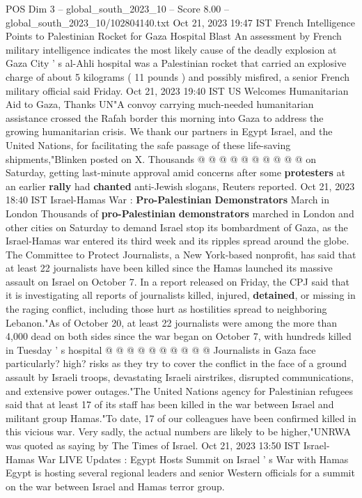 \begin{textsample}{POS Dim 3 – global\_south\_2023\_10 – Score 8.00 – global\_south\_2023\_10/102804140.txt}
Oct 21, 2023 19:47 IST French Intelligence Points to Palestinian Rocket for Gaza Hospital Blast An assessment by French military intelligence indicates the most likely cause of the deadly explosion at Gaza City ' s al-Ahli hospital was a Palestinian rocket that carried an explosive charge of about 5 kilograms ( 11 pounds ) and possibly misfired, a senior French military official said Friday.
Oct 21, 2023 19:40 IST US Welcomes Humanitarian Aid to Gaza, Thanks UN"A convoy carrying much-needed humanitarian assistance crossed the Rafah border this morning into Gaza to address the growing humanitarian crisis.
We thank our partners in Egypt Israel, and the United Nations, for facilitating the safe passage of these life-saving shipments,"Blinken posted on X.
Thousands @ @ @ @ @ @ @ @ @ @ on Saturday, getting last-minute approval amid concerns after some \textbf{protesters} at an earlier \textbf{rally} had \textbf{chanted} anti-Jewish slogans, Reuters reported.
Oct 21, 2023 18:40 IST Israel-Hamas War : \textbf{Pro-Palestinian} \textbf{Demonstrators} March in London Thousands of \textbf{pro-Palestinian} \textbf{demonstrators} marched in London and other cities on Saturday to demand Israel stop its bombardment of Gaza, as the Israel-Hamas war entered its third week and its ripples spread around the globe.
The Committee to Protect Journalists, a New York-based nonprofit, has said that at least 22 journalists have been killed since the Hamas launched its massive assault on Israel on October 7.
In a report released on Friday, the CPJ said that it is investigating all reports of journalists killed, injured, \textbf{detained}, or missing in the raging conflict, including those hurt as hostilities spread to neighboring Lebanon."As of October 20, at least 22 journalists were among the more than 4,000 dead on both sides since the war began on October 7, with hundreds killed in Tuesday ' s hospital @ @ @ @ @ @ @ @ @ @ Journalists in Gaza face particularly? high? risks as they try to cover the conflict in the face of a ground assault by Israeli troops, devastating Israeli airstrikes, disrupted communications, and extensive power outages."The United Nations agency for Palestinian refugees said that at least 17 of its staff has been killed in the war between Israel and militant group Hamas."To date, 17 of our colleagues have been confirmed killed in this vicious war.
Very sadly, the actual numbers are likely to be higher,"UNRWA was quoted as saying by The Times of Israel.
Oct 21, 2023 13:50 IST Israel-Hamas War LIVE Updates : Egypt Hosts Summit on Israel ' s War with Hamas Egypt is hosting several regional leaders and senior Western officials for a summit on the war between Israel and Hamas terror group.

\end{textsample}
